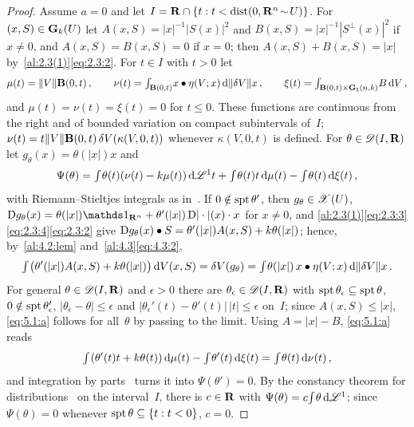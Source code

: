 \begin{proof}
    Assume $a = 0$ and let $I = \mathbf{R} \cap \{ t : t < \operatorname{dist}(0, \mathbf{R}^{n} \!\sim\! U) \}$. For
    $(x,S) \in \mathbf{G}_{k}(U)$ let $A(x,S) = |x|^{-1} |S(x)|^2$ and $B(x,S) = |x|^{-1} |S^\perp(x)|^2$ if
    $x \ne 0$, and $A(x,S) = B(x,S) = 0$ if $x = 0$; then $A(x,S) + B(x,S) = |x|$
    by~\ref{al:2.3(1)}\eqref{eq:2.3:2}. For $t \in I$ with $t > 0$ let
    \begin{displaymath}
        \mu(t) = \|V\| \mathbf{B}(0,t) \,, \qquad \nu(t) = {\textstyle\int_{\mathbf{B}(0,t)}^{}} x \bullet \eta(V;x)
        \,\mathrm{d} \|\delta V\| x \,, \qquad \xi(t) = {\textstyle\int_{\mathbf{B}(0,t) \times \mathbf{G}_{\natural}(n,k)}^{}}
        B \,\mathrm{d} V \,,
    \end{displaymath}
    and $\mu(t) = \nu(t) = \xi(t) = 0$ for $t \le 0$. These functions are continuous from the
    right and of bounded variation on compact subintervals of~$I$; $\nu(t) = t \|V\|
    \mathbf{B}(0,t) \, \delta V(\kappa(V,0,t))$ whenever $\kappa(V,0,t)$ is defined. For $\theta \in
    \mathscr{D}(I,\mathbf{R})$ let $g_\theta(x) = \theta(|x|) x$ and
    \begin{displaymath}
        \Psi(\theta) = {\textstyle\int_{}^{}} \theta(t) (\nu(t) - k \mu(t)) \,\mathrm{d} \mathscr{L}^1 t + {\textstyle\int_{}^{}}
        \theta(t) t \,\mathrm{d} \mu(t) - {\textstyle\int_{}^{}} \theta(t) \,\mathrm{d} \xi(t) \,,
    \end{displaymath}
    with Riemann--Stieltjes integrals as in~\cite[2.5.17]{Federer1969}. If $0 \notin \operatorname{spt}
    \theta'$, then $g_\theta \in \mathscr{X}(U)$, $\uD g_\theta(x) = \theta(|x|) \id{\R^{\adim}} +
    \theta'(|x|) \, \uD|\cdot|(x) \cdot x$ for $x \ne 0$, and
    \ref{al:2.3(1)}\eqref{eq:2.3:3}\eqref{eq:2.3:4}\eqref{eq:2.3:2} give $\mathrm{D} g_\theta(x) \bullet
    S = \theta'(|x|) A(x,S) + k \theta(|x|)$; hence, by~\ref{al:4.2:lem}
    and~\ref{al:4.3}\eqref{eq:4.3:2},
    \begin{equation}
        \label{eq:5.1:a}
        {\textstyle\int_{}^{}} \big( \theta'(|x|) A(x,S) + k \theta(|x|) \big) \,\mathrm{d} V(x,S) = \delta
        V(g_\theta) = {\textstyle\int_{}^{}} \theta(|x|) \, x \bullet \eta(V;x) \,\mathrm{d} \|\delta V\| x \,.
    \end{equation}
    For general $\theta \in \mathscr{D}(I,\mathbf{R})$ and $\epsilon > 0$ there are $\theta_\epsilon \in
    \mathscr{D}(I,\mathbf{R})$ with $\operatorname{spt} \theta_\epsilon \subseteq \operatorname{spt} \theta$, $0 \notin \operatorname{spt}
    \theta_\epsilon'$, $|\theta_\epsilon - \theta| \le \epsilon$ and $|\theta_\epsilon'(t) -
    \theta'(t)| \, |t| \le \epsilon$ on~$I$; since $A(x,S) \le |x|$, \eqref{eq:5.1:a} follows for
    all~$\theta$ by passing to the limit. Using $A = |x| - B$, \eqref{eq:5.1:a} reads
    \begin{displaymath}
        {\textstyle\int_{}^{}} (\theta'(t) t + k \theta(t)) \,\mathrm{d} \mu(t) - {\textstyle\int_{}^{}} \theta'(t) \,\mathrm{d}
        \xi(t) = {\textstyle\int_{}^{}} \theta(t) \,\mathrm{d} \nu(t) \,,
    \end{displaymath}
    and integration by parts~\cite[2.5.17]{Federer1969} turns it into $\Psi(\theta') = 0$. By the
    constancy theorem for distributions~\cite[4.1.4]{Federer1969} on the interval~$I$, there is
    $c \in \mathbf{R}$ with $\Psi(\theta) = c {\textstyle\int_{}^{}} \theta \,\mathrm{d} \mathscr{L}^1$; since $\Psi(\theta) = 0$
    whenever $\operatorname{spt} \theta \subseteq \{ t : t < 0 \}$, $c = 0$.


\end{proof}
